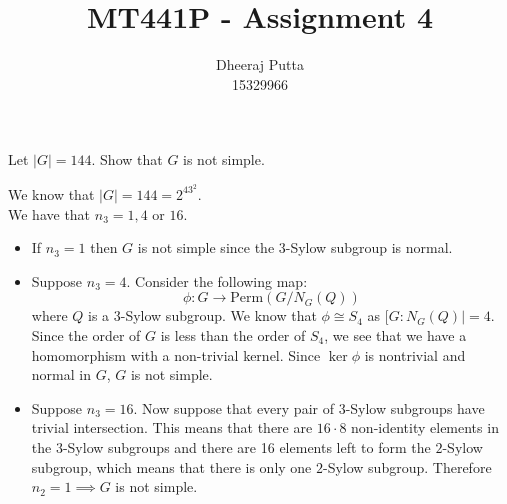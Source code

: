 \documentclass[12pt, answers]{exam}
\title{MT441P - Assignment 4}
\author{Dheeraj Putta \\ 15329966}
\date{}
\begin{document}
    \maketitle
    \begin{questions}
        \thispagestyle{foot}
        \setcounter{question}{1}
        \question Let $|G| = 144$. Show that $G$ is not simple.
        \begin{solution}
            We know that $|G| = 144 = 2^43^2$.\\
            We have that $n_3 = 1, 4$ or $16$.
            \begin{itemize}
                \item If $n_3 = 1$ then $G$ is not simple since the $3$-Sylow subgroup is normal.
                \item Suppose $n_3 = 4$. Consider the following map:
                \[ \phi\colon G \to \text{Perm}(G/N_G(Q)) \]
                where $Q$ is a $3$-Sylow subgroup. We know that $\phi \cong S_4$ as $[G: N_G(Q)| = 4$. Since the order of $G$ is less than the order of $S_4$, we see that we have a homomorphism with a non-trivial kernel. Since $\ker \phi$ is nontrivial and normal in $G$, $G$ is not simple.

                \item Suppose $n_3 = 16$. Now suppose that every pair of 3-Sylow subgroups have trivial intersection. This means that there are $16 \cdot 8$ non-identity elements in the $3$-Sylow subgroups and there are 16 elements left to form the $2$-Sylow subgroup, which means that there is only one $2$-Sylow subgroup. Therefore $n_2 = 1\implies G$ is not simple. \\


\end{itemize}
\end{solution}
\end{questions}
\end{document}
